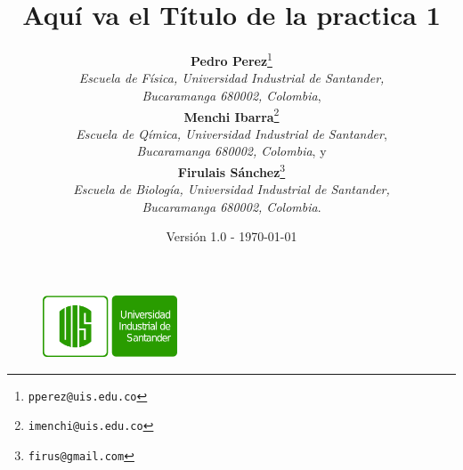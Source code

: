 \documentclass[spanish,notitlepage,letterpaper,11pt]{article} %
\begin{document}
\begin{figure}
{\includegraphics[width=40mm]{figuras/logouis}} 
\end{figure}
\title{\bf Aquí va el Título de la practica 1}
\author{
\textbf{Pedro Perez}\thanks{\texttt{pperez@uis.edu.co}} \\
\textit{Escuela de F\'isica, Universidad Industrial de Santander,}\\ 
\textit{Bucaramanga 680002, Colombia}, \\
\textbf{Menchi Ibarra}\thanks{\texttt{imenchi@uis.edu.co}} \\
\textit{Escuela de Q\'imica, Universidad Industrial de Santander},\\ 
\textit{Bucaramanga 680002, Colombia},  y \\
\textbf{Firulais Sánchez}\thanks{\texttt{firus@gmail.com}} \\
\textit{Escuela de Biología, Universidad Industrial de Santander,  }\\ 
\textit{Bucaramanga 680002, Colombia}. 
}
\date{Versión 1.0 - \today}
\maketitle
\tableofcontents
\newpage
\end{document}
